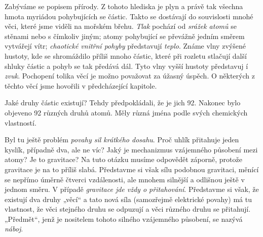 {    Zabýváme se popisem přírody. Z tohoto hlediska je plyn a právě tak všechna hmota myriádou 
    pohybujících se částic. Takto se dostávají do souvislosti mnohé věci, které jsme viděli na 
    mořském břehu. \emph{Tlak} pochází od \emph{srážek atomů} se stěnami nebo s čímkoliv jiným; 
    atomy pohybující se převážně jedním směrem vytvářejí vítr; \emph{chaotické vnitřní pohyby} 
    představují \emph{teplo}. Známe vlny zvýšené hustoty, kde se shromáždilo příliš mnoho částic, 
    které při rozletu stlačují další shluky částic a pohyb se tak předává dál. Tyto vlny vyšší 
    hustoty představuj í \emph{zvuk}. Pochopení tolika věcí je možno považovat za úžasný úspěch. O 
    některých z těchto věcí jsme hovořili v předcházející kapitole.
    
    Jaké druhy částic existují? Tehdy předpokládali, že je jich 92. Nakonec bylo objeveno 92 
    různých druhů atomů. Měly různá jména podle svých chemických vlastností.
    
    Byl tu ještě problém \emph{povahy sil krátkého dosahu}. Proč uhlík přitahuje jeden kyslík, 
    případně dva, ale ne víc? Jaký je mechanizmus vzájemného působení mezi atomy? Je to gravitace? 
    Na tuto otázku musíme odpovědět záporně, protože gravitace je na to příliš slabá. Představme si 
    však sílu podobnou gravitaci, měnící se nepřímo úměrně čtverci vzdálenosti, ale mnohem silnější 
    a odlišnou ještě v jednom směru. V případě \emph{gravitace jde vždy o přitahování}. Představme 
    si však, že existují dva druhy „věcí“ a tato nová síla  (samozřejmě elektrické povahy) má tu 
    vlastnost, že věci stejného druhu se odpuzují a věci různého druhu se přitahují. „Předmět“, 
    jenž je nositelem tohoto silného vzájemného působení, se nazývá \emph{náboj}.  
    
}
